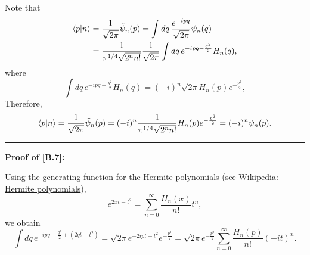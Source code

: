 \documentclass[10pt, a4paper]{article}
\numberwithin{equation}{section}
\begin{document}
\begin{itemize}
		\begin{tcolorbox}[title=Remark:]
			Note that
			\begin{align}
				\braket{p | n} &= \frac{1}{\sqrt{2 \pi}} \tilde{\psi}_n(p) = \int dq \, \frac{e^{- i p q}}{\sqrt{2 \pi}} \psi_n(q) \notag \\
				&= \frac{1}{\pi^{1 / 4} \sqrt{2^n n!}} \frac{1}{\sqrt{2 \pi}} \int dq \, e^{- i p q - \frac{q^2}{2}} H_n(q), 
			\end{align}
			where
			\begin{equation} \label{B.7}
				\int dq \, e^{- i p q - \frac{q^2}{2}} H_n(q) = (- i)^n \sqrt{2 \pi} H_n(p) e^{- \frac{p^2}{2}},
			\end{equation}
			Therefore,
			\begin{equation}
				\braket{p | n} = \frac{1}{\sqrt{2 \pi}} \tilde{\psi}_n(p) = (- i)^n \frac{1}{\pi^{1 / 4} \sqrt{2^n n!}} H_n(p) e^{- \frac{p^2}{2}} = (- i)^n \psi_n(p).
			\end{equation}
			
			\noindent\rule[0.5ex]{\linewidth}{0.5pt} %
			
			\textbf{Proof of \eqref{B.7}:}
			
			Using the generating function for the Hermite polynomials (see \href{https://en.wikipedia.org/wiki/Hermite_polynomials#Generating_function}{Wikipedia: Hermite polynomials}),
			\begin{equation}
				e^{2 x t - t^2} = \sum_{n = 0}^\infty \frac{H_n(x)}{n!} t^n,
			\end{equation}
			we obtain
			\begin{equation}
				\int dq \, e^{- i p q - \frac{q^2}{2} + (2 q t - t^2)} = \sqrt{2 \pi} e^{- 2 i p t + t^2} e^{- \frac{p^2}{2}} = \sqrt{2 \pi} e^{- \frac{p^2}{2}} \sum_{n = 0}^\infty \frac{H_n(p)}{n!} (- i t)^n.
			\end{equation}
		\end{tcolorbox}
	\end{itemize}
\end{document}
